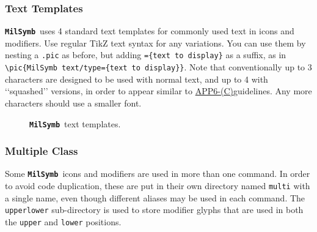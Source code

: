 \documentclass[a4paper, titlepage]{article}
\newcommand\MilSymb{\textbf{\texttt{MilSymb}}}
\newcommand\DocLink{\href{https://www.awl.edu.pl/images/en/APP_6_C.pdf}{APP6-(C)}}
\begin{document}
\subsubsection{Text Templates}
\label{text}

\MilSymb\  uses 4 standard text templates for commonly used text in icons and modifiers. Use regular TikZ text syntax for any variations. You can use them by nesting a \texttt{.pic} as before, but adding \texttt{=\{text to display\}} as a suffix, as in \texttt{\textbackslash pic\{MilSymb text/type=\{text to display\}\}}. Note that conventionally up to 3 characters are designed to be used with normal text, and up to 4 with \lq\lq{}squashed\rq\rq{} versions, in order to appear similar to \DocLink guidelines. Any more characters should use a smaller font.

\begin{figure}[H]
\centering
{}
\caption{\MilSymb\  text templates.}
\end{figure}

\subsubsection{Multiple Class}
\label{multi} 

Some \MilSymb\  icons and modifiers are used in more than one command. In order to avoid code duplication, these are put in their own directory named \texttt{multi} with a single name, even though different aliases may be used in each command. The \texttt{upperlower} sub-directory is used to store modifier glyphs that are used in both the \texttt{upper} and \texttt{lower} positions.
\end{document}
